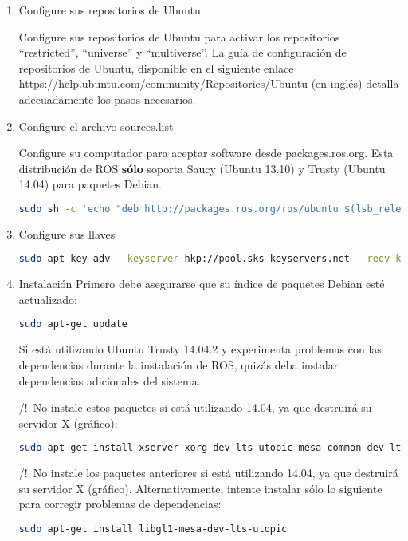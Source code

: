 \begin{enumerate}
\renewcommand{\labelenumii}{\theenumii}
\renewcommand{\theenumii}{\theenumi.\arabic{enumii}.}
	\item Configure sus repositorios de Ubuntu

	Configure sus repositorios de Ubuntu para activar los repositorios ``restricted'', ``universe'' y ``multiverse''. La guía de configuración de repositorios de Ubuntu, disponible en el siguiente enlace \url{https://help.ubuntu.com/community/Repositories/Ubuntu} (en inglés) detalla adecuadamente los pasos necesarios.
	\item Configure el archivo sources.list

	Configure su computador para aceptar software desde packages.ros.org. Esta distribución de ROS \textbf{sólo} soporta Saucy (Ubuntu 13.10) y Trusty (Ubuntu 14.04) para paquetes Debian.

	\begin{lstlisting}[language=bash]
sudo sh -c 'echo "deb http://packages.ros.org/ros/ubuntu $(lsb_release -sc) main" > /etc/apt/sources.list.d/ros-latest.list'
	\end{lstlisting}

	\item Configure sus llaves

	\begin{lstlisting}[language=bash]
sudo apt-key adv --keyserver hkp://pool.sks-keyservers.net --recv-key\\ 0xB01FA116
	\end{lstlisting}

	\item Instalación
	Primero debe asegurarse que su índice de paquetes Debian esté actualizado:

	\begin{lstlisting}[language=bash]
sudo apt-get update
	\end{lstlisting}

	Si está utilizando Ubuntu Trusty 14.04.2 y experimenta problemas con las dependencias durante la instalación de ROS, quizás deba instalar dependencias adicionales del sistema.

/!\ No instale estos paquetes si está utilizando 14.04, ya que destruirá su servidor X (gráfico):
	\begin{lstlisting}[language=bash]
sudo apt-get install xserver-xorg-dev-lts-utopic mesa-common-dev-lts-utopic libxatracker-dev-lts-utopic libopenvg1-mesa-dev-lts-utopic libgles2-mesa-dev-lts-utopic libgles1-mesa-dev-lts-utopic libgl1-mesa-dev-lts-utopic libgbm-dev-lts-utopic libegl1-mesa-dev-lts-utopic
	\end{lstlisting}
/!\ No instale los paquetes anteriores si está utilizando 14.04, ya que destruirá su servidor X (gráfico). Alternativamente, intente instalar sólo lo siguiente para corregir problemas de dependencias:
	\begin{lstlisting}[language=bash]
sudo apt-get install libgl1-mesa-dev-lts-utopic
	\end{lstlisting}


\end{enumerate}
